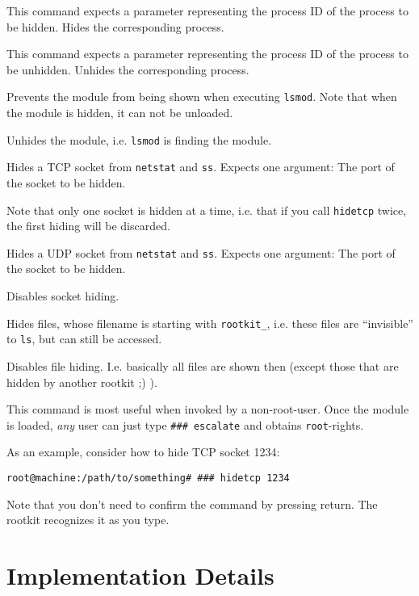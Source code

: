 \documentclass[10pt, letterpaper]{article}
\begin{document}
\begin{description}[font=\ttfamily]
\item[hideproc] This command expects a parameter representing the process ID of the process to be hidden. Hides the corresponding process.
\item[unhideproc] This command expects a parameter representing the process ID of the process to be unhidden. Unhides the corresponding process.
\item[hidemodule] Prevents the module from being shown when executing \texttt{lsmod}. Note that when the module is hidden, it can not be unloaded.
\item[unhidemodule] Unhides the module, i.e. \texttt{lsmod} is finding the module.
\item[hidetcp] Hides a TCP socket from \texttt{netstat} and \texttt{ss}. Expects one argument: The port of the socket to be hidden. 

Note that only one socket is hidden at a time, i.e. that if you call \texttt{hidetcp} twice, the first hiding will be discarded.
\item[hideudp] Hides a UDP socket from \texttt{netstat} and \texttt{ss}. Expects one argument: The port of the socket to be hidden.
\item[unhidesocket] Disables socket hiding.
\item[hidefiles] Hides files, whose filename is starting with \texttt{rootkit\_}, i.e. these files are ``invisible'' to \texttt{ls}, but can still be accessed.
\item[unhidefiles] Disables file hiding. I.e. basically all files are shown then (except those that are hidden by another rootkit ;) ).
\item[escalate] This command is most useful when invoked by a non-root-user. Once the module is loaded, \emph{any} user can just type \texttt{\#\#\# escalate} and obtains \texttt{root}-rights.
\end{description}

As an example, consider how to hide TCP socket 1234:

\begin{verbatim}
root@machine:/path/to/something# ### hidetcp 1234
\end{verbatim}

Note that you don't need to confirm the command by pressing return. The rootkit recognizes it as you type.

\section{Implementation Details}
\end{document}
